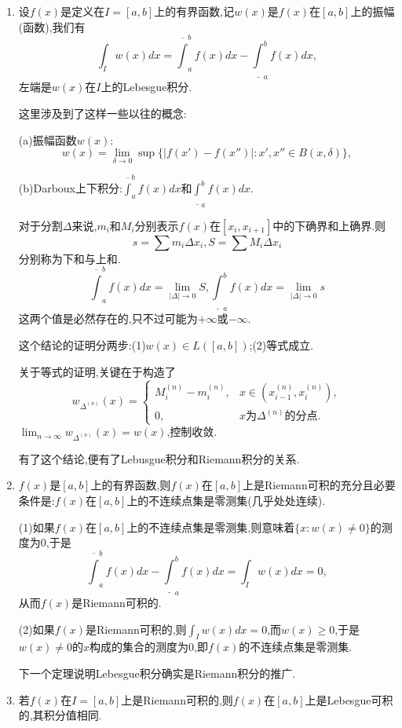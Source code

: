 \documentclass[12pt,a4paper,openany]{book}
\begin{document}
\begin{enumerate}
\item 设$f(x)$是定义在$I=[a,b]$上的有界函数,记$w(x)$是$f(x)$在$[a,b]$上的振幅(函数),我们有
\[
\int_{I}{w(x)dx} = \overline{\int}_{a}^{b}{f(x)dx} - \underline{\int}_{a}^{b}{f(x)dx},
\]
左端是$w(x)$在$I$上的Lebesgue积分.

这里涉及到了这样一些以往的概念:

(a)振幅函数$w(x)$:
\[
w(x) = \lim_{\delta \rightarrow 0}{\sup\{|f(x') - f(x'')|: x',x'' \in B(x, \delta)\}},
\]

(b)Darboux上下积分:$\overline{\int}_{a}^{b}{f(x)dx}$和$\underline{\int}_{a}^{b}{f(x)dx}$.

对于分割$\Delta$来说,$m_i$和$M_i$分别表示$f(x)$在$[x_i,x_{i+1}]$中的下确界和上确界.则
\[
s = \sum{m_i\Delta{x_i}}, S = \sum{M_i\Delta{x_i}}
\]
分别称为下和与上和.
\[
\overline{\int}_{a}^{b}{f(x)dx} = \lim_{|\Delta| \rightarrow 0}{S}, \underline{\int}_{a}^{b}{f(x)dx}=\lim_{|\Delta| \rightarrow 0}{s}
\]
这两个值是必然存在的,只不过可能为$+\infty$或$-\infty$.

这个结论的证明分两步:(1)$w(x) \in L([a,b])$;(2)等式成立.

关于等式的证明,关键在于构造了
\[
w_{\Delta^{(n)}}(x) = \begin{cases}
M_i^{(n)} - m_i^{(n)}, &x \in (x_{i-1}^{(n)}, x_{i}^{(n)}),\\
0, &x \text{为}\Delta^{(n)}\text{的分点}.
\end{cases}
\]
$\lim_{n \rightarrow \infty}{w_{\Delta^{(n)}}(x)} = w(x)$,控制收敛.

有了这个结论,便有了Lebusgue积分和Riemann积分的关系.

\item $f(x)$是$[a,b]$上的有界函数,则$f(x)$在$[a,b]$上是Riemann可积的充分且必要条件是:$f(x)$在$[a,b]$上的不连续点集是零测集(几乎处处连续).

(1)如果$f(x)$在$[a,b]$上的不连续点集是零测集,则意味着$\{x : w(x) \neq 0\}$的测度为0,于是
\[
\overline{\int}_{a}^{b}{f(x)dx} - \underline{\int}_{a}^{b}{f(x)dx} = \int_{I}{w(x)dx} = 0,
\]
从而$f(x)$是Riemann可积的.

(2)如果$f(x)$是Riemann可积的,则$\int_{I}{w(x)dx} = 0$,而$w(x)\ge 0$,于是$w(x) \neq 0$的$x$构成的集合的测度为0,即$f(x)$的不连续点集是零测集.

下一个定理说明Lebesgue积分确实是Riemann积分的推广.

\item 若$f(x)$在$I=[a,b]$上是Riemann可积的,则$f(x)$在$[a,b]$上是Lebesgue可积的,其积分值相同.


\end{enumerate}
\end{document}
